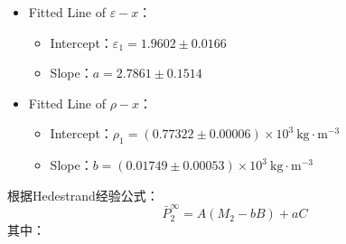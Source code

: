 \documentclass[cn,hazy,pku,12pt,normal,math=newtx,cite=super]{elegantnote}
\begin{document}
\begin{itemize}
    \item Fitted Line of $\varepsilon-x$：
    \begin{itemize}
        \item Intercept：$\varepsilon_1 = 1.9602 \pm 0.0166$
        \item Slope：$a = 2.7861\pm 0.1514$
    \end{itemize}
    \item Fitted Line of $\rho-x$：
    \begin{itemize}
        \item Intercept：$\rho_1 = (0.77322 \pm 0.00006) \times 10^{3} \mathrm{~kg\cdot m^{-3}}$
        \item Slope：$b = (0.01749\pm 0.00053)\times 10^{3}\mathrm{~kg\cdot m^{-3}} $
    \end{itemize}
\end{itemize}



根据Hedestrand经验公式：
\begin{equation}\label{eq:5}
    \bar{P}_2^\infty = A(M_2-bB)+aC
\end{equation}
其中：
\end{document}
